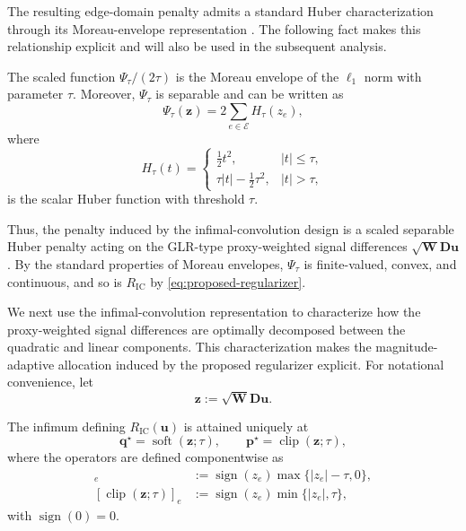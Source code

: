 The resulting edge-domain penalty admits a standard Huber characterization through its Moreau-envelope representation \cite{Selesnick2017}.
The following fact makes this relationship explicit and will also be used in the subsequent analysis.

\begin{fact}
\label{fact:huber}
The scaled function $\Psi_\tau/(2\tau)$ is the Moreau envelope of the $\ell_1$ norm with parameter $\tau$.
Moreover, $\Psi_\tau$ is separable and can be written as
\[
\Psi_\tau(\mathbf{z})
=
2\sum_{e\in\mathcal{E}}H_\tau(z_e),
\]
where
\[
H_\tau(t)
=
\begin{cases}
\frac{1}{2}t^2, & |t|\leq\tau,\\
\tau|t|-\frac{1}{2}\tau^2, & |t|>\tau,
\end{cases}
\]
is the scalar Huber function with threshold $\tau$.
\end{fact}

Thus, the penalty induced by the infimal-convolution design is a scaled separable Huber penalty acting on the GLR-type proxy-weighted signal differences $\sqrt{\mathbf{W}}\mathbf{D}\mathbf{u}$.
By the standard properties of Moreau envelopes, $\Psi_\tau$ is finite-valued, convex, and continuous, and so is $R_{\mathrm{IC}}$ by \eqref{eq:proposed-regularizer}.

We next use the infimal-convolution representation to characterize how the proxy-weighted signal differences are optimally decomposed between the quadratic and linear components.
This characterization makes the magnitude-adaptive allocation induced by the proposed regularizer explicit.
For notational convenience, let
\begin{equation}
\mathbf{z}
:=
\sqrt{\mathbf{W}}\mathbf{D}\mathbf{u}.
\label{eq:z-definition}
\end{equation}

\begin{proposition}
\label{prop:optimal-decomposition}
The infimum defining $R_{\mathrm{IC}}(\mathbf{u})$ is attained uniquely at
\begin{equation}
\mathbf{q}^{\star}
=
\operatorname{soft}(\mathbf{z};\tau),
\qquad
\mathbf{p}^{\star}
=
\operatorname{clip}(\mathbf{z};\tau),
\label{eq:optimal-decomposition}
\end{equation}
where the operators are defined componentwise as
\begin{align}
[\operatorname{soft}(\mathbf{z};\tau)]_e
&:=
\operatorname{sign}(z_e)
\max\{|z_e|-\tau,0\},
\label{eq:soft-definition}
\\
[\operatorname{clip}(\mathbf{z};\tau)]_e
&:=
\operatorname{sign}(z_e)
\min\{|z_e|,\tau\},
\label{eq:clip-definition}
\end{align}
with $\operatorname{sign}(0)=0$.
\end{proposition}


